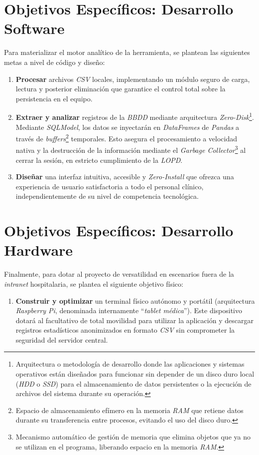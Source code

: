\section{Objetivos Específicos: Desarrollo Software}
Para materializar el motor analítico de la herramienta, se plantean las siguientes metas a nivel de código y diseño:

\begin{enumerate}
    \item \textbf{Procesar} archivos \textit{CSV} locales, implementando un módulo seguro de carga, lectura y posterior eliminación que garantice el control total sobre la persistencia en el equipo.
    \item \textbf{Extraer y analizar} registros de la \textit{BBDD} mediante arquitectura \textit{Zero-Disk}\footnote{Arquitectura o metodología de desarrollo donde las aplicaciones y sistemas operativos están diseñados para funcionar sin depender de un disco duro local (\textit{HDD} o \textit{SSD}) para el almacenamiento de datos persistentes o la ejecución de archivos del sistema durante su operación.}. Mediante \textit{SQLModel}, los datos se inyectarán en \textit{DataFrames} de \textit{Pandas} a través de \textit{buffers}\footnote{Espacio de almacenamiento efímero en la memoria \textit{RAM} que retiene datos durante su transferencia entre procesos, evitando el uso del disco duro.} temporales. Esto asegura el procesamiento a velocidad nativa y la destrucción de la información mediante el \textit{Garbage Collector}\footnote{Mecanismo automático de gestión de memoria que elimina objetos que ya no se utilizan en el programa, liberando espacio en la memoria \textit{RAM}.} al cerrar la sesión, en estricto cumplimiento de la \textit{LOPD}.
    \item \textbf{Diseñar} una interfaz intuitiva, accesible y \textit{Zero-Install} que ofrezca una experiencia de usuario satisfactoria a todo el personal clínico, independientemente de su nivel de competencia tecnológica.
\end{enumerate}

\section{Objetivos Específicos: Desarrollo Hardware}
Finalmente, para dotar al proyecto de versatilidad en escenarios fuera de la \textit{intranet} hospitalaria, se plantea el siguiente objetivo físico:

\begin{enumerate}
    \item \textbf{Construir y optimizar} un terminal físico autónomo y portátil (arquitectura \textit{Raspberry Pi}, denominada internamente ``\textit{tablet médica}''). Este dispositivo dotará al facultativo de total movilidad para utilizar la aplicación y descargar registros estadísticos anonimizados en formato \textit{CSV} sin comprometer la seguridad del servidor central.
\end{enumerate}







